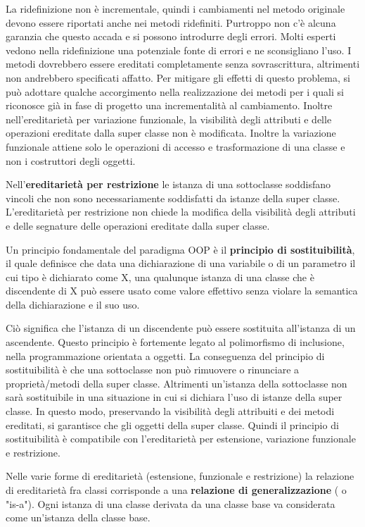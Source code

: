 \documentclass[a4paper,18pt]{extarticle}
\begin{document}
La ridefinizione non è incrementale, quindi i cambiamenti nel metodo originale devono essere riportati anche nei metodi ridefiniti. Purtroppo non c'è alcuna garanzia che questo accada e si possono introdurre degli errori. Molti esperti vedono nella ridefinizione una potenziale fonte di errori e ne sconsigliano l'uso. I metodi dovrebbero essere ereditati completamente senza sovrascrittura, altrimenti non andrebbero specificati affatto. Per mitigare gli effetti di questo problema, si può adottare qualche accorgimento nella realizzazione dei metodi per i quali si riconosce già in fase di progetto una incrementalità al cambiamento. Inoltre nell'ereditarietà per variazione funzionale, la visibilità degli attributi e delle operazioni ereditate dalla super classe non è modificata. Inoltre la variazione funzionale attiene solo le operazioni di accesso e trasformazione di una classe e non i costruttori degli oggetti.

Nell'\textbf{ereditarietà per restrizione} le istanza di una sottoclasse soddisfano vincoli che non sono necessariamente soddisfatti da istanze della super classe. L’ereditarietà per restrizione non chiede la modifica della visibilità degli attributi e delle segnature delle operazioni ereditate dalla super classe.

Un principio fondamentale del paradigma OOP è il \textbf{principio di sostituibilità}, il quale definisce che data una dichiarazione di una variabile o di un parametro il cui tipo è dichiarato come X, una qualunque istanza di una classe che è discendente di X può essere usato come valore effettivo senza violare la semantica della dichiarazione e il suo uso.

Ciò significa che l'istanza di un discendente può essere sostituita all'istanza di un ascendente. Questo principio è fortemente legato al polimorfismo di inclusione, nella programmazione orientata a oggetti. La conseguenza del principio di sostituibilità è che una sottoclasse non può rimuovere o rinunciare a proprietà/metodi della super classe. Altrimenti un'istanza della sottoclasse non sarà sostituibile in una situazione in cui si dichiara l'uso di istanze della super classe. In questo modo, preservando la visibilità degli attribuiti e dei metodi ereditati, si garantisce che gli oggetti della super classe. Quindi il principio di sostituibilità è compatibile con l'ereditarietà per estensione, variazione funzionale e restrizione.

Nelle varie forme di ereditarietà (estensione, funzionale e restrizione) la relazione di ereditarietà fra classi corrisponde a una \textbf{relazione di generalizzazione} ( o "is-a"). Ogni istanza di una classe derivata da una classe base va considerata come un'istanza della classe base.
\end{document}
